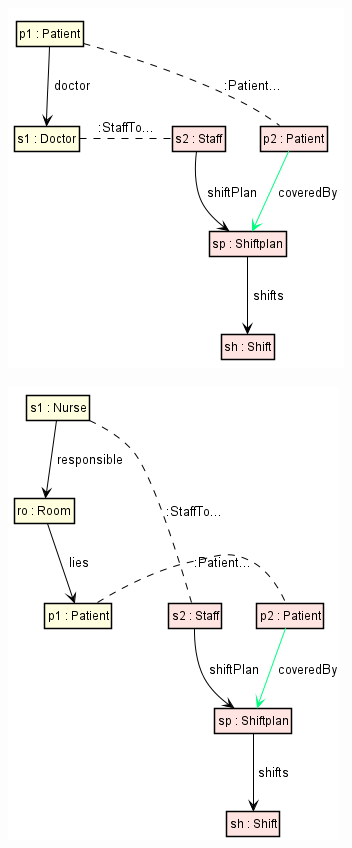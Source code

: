 \begin{figure}[h]
    \centering
    
    \begin{subfigure}[b]{0.3\textwidth}
    
    \includegraphics[scale=0.45 ]{pictures/DocShiftplanRule.png}
    \caption{}
    \label{DocShiftplanRule}
    
    \end{subfigure}\hspace{2cm}
    \begin{subfigure}[b]{0.3\textwidth}
    
    \includegraphics[scale=0.45 ]{pictures/nurseShiftPlan.png}
    \caption{}
    \label{NurseShiftplanRule}
    
    \end{subfigure}
    
\end{figure}

